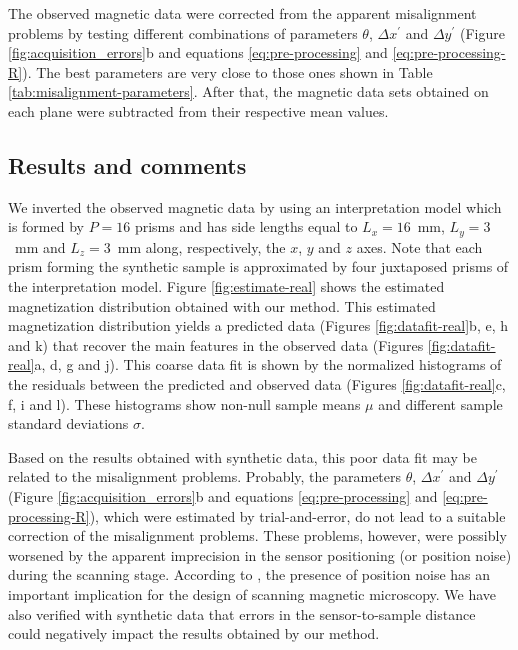 \documentclass[galley,gc]{agutex}
\begin{document}
\begin{article}
The observed magnetic data were corrected from the apparent misalignment 
problems by testing different combinations of parameters $\theta$, 
$\Delta x^{\prime}$ and $\Delta y^{\prime}$ 
(Figure \ref{fig:acquisition_errors}b and equations \ref{eq:pre-processing} 
and \ref{eq:pre-processing-R}). The best parameters are very close to 
those ones shown in Table \ref{tab:misalignment-parameters}. After that, 
the magnetic data sets obtained on each plane were subtracted from their 
respective mean values.

\subsection{Results and comments}
\label{subsec:Results and comments}

We inverted the observed magnetic data by using an
interpretation model which is formed by $P = 16$ prisms
and has side lengths equal to $L_{x} = 16$~mm, $L_{y} = 3$~mm 
and $L_{z} = 3$~mm along, respectively, the $x$, $y$ and 
$z$ axes.
Note that each prism forming the synthetic sample is 
approximated by four juxtaposed prisms of the 
interpretation model.
Figure \ref{fig:estimate-real} shows the estimated
magnetization distribution obtained with our method.
This estimated magnetization distribution yields a predicted data
(Figures \ref{fig:datafit-real}b, e, h and k) that recover
the main features in the observed data (Figures \ref{fig:datafit-real}a, 
d, g and j).
This coarse data fit is shown by the normalized histograms of 
the residuals between the predicted and
observed data (Figures \ref{fig:datafit-real}c, f, i and l).
These histograms show non-null sample means $\mu$ and 
different sample standard deviations $\sigma$.

Based on the results obtained with synthetic data,
this poor data fit may be related to the misalignment problems.
Probably, the parameters $\theta$, $\Delta x^{\prime}$ and 
$\Delta y^{\prime}$ (Figure \ref{fig:acquisition_errors}b and 
equations \ref{eq:pre-processing} and \ref{eq:pre-processing-R}),
which were estimated by trial-and-error, do not lead to a suitable
correction of the misalignment problems.
These problems, however, were possibly worsened by the
apparent imprecision in the sensor positioning (or position noise)
during the scanning stage.
According to \citet{lee2004}, the presence of position noise has 
an important implication for the design of scanning magnetic microscopy.
We have also verified with synthetic data that errors in the 
sensor-to-sample distance could negatively impact the results obtained
by our method.


\end{article}
\end{document}
